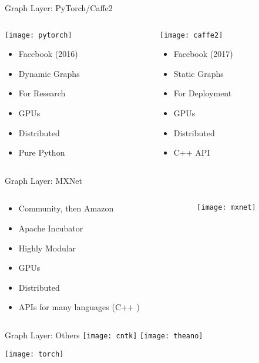 \begin{slide}{Graph Layer: PyTorch/Caffe2}
  \begin{columns}
    \begin{column}{0.4\textwidth}
      \centering
      \hspace{-1.2cm}\texttt{[image: pytorch]}
      \vspace{0.2cm}

      \begin{itemize}
        \item Facebook (2016)
        \item Dynamic Graphs
        \item For Research
        \item GPUs \cmark
        \item Distributed \cmark
        \item Pure Python
      \end{itemize}
    \end{column}
    \begin{column}{0.5\textwidth}
      \centering
      \hspace{-1.2cm}\texttt{[image: caffe2]}
      \vspace{0.4cm}

      \begin{itemize}
        \item Facebook (2017)
        \item Static Graphs
        \item For Deployment
        \item GPUs \cmark
        \item Distributed \cmark
        \item C++ API \cmark
      \end{itemize}
    \end{column}
  \end{columns}
\end{slide}

\begin{slide}{Graph Layer: MXNet}
  \begin{columns}
    \begin{column}{0.5\textwidth}
      \begin{itemize}
        \item Community, then Amazon
        \item Apache Incubator
        \item Highly Modular
        \item GPUs \cmark
        \item Distributed \cmark
        \item APIs for many languages (C++ \cmark)
      \end{itemize}
    \end{column}
    \begin{column}{0.5\textwidth}
      \texttt{[image: mxnet]}
    \end{column}
  \end{columns}
\end{slide}

\begin{slide}{Graph Layer: Others}
  \texttt{[image: cntk]}
  \hspace{1cm}
  \texttt{[image: theano]}


  \vspace{1.4cm}
  \texttt{[image: torch]}
\end{slide}

